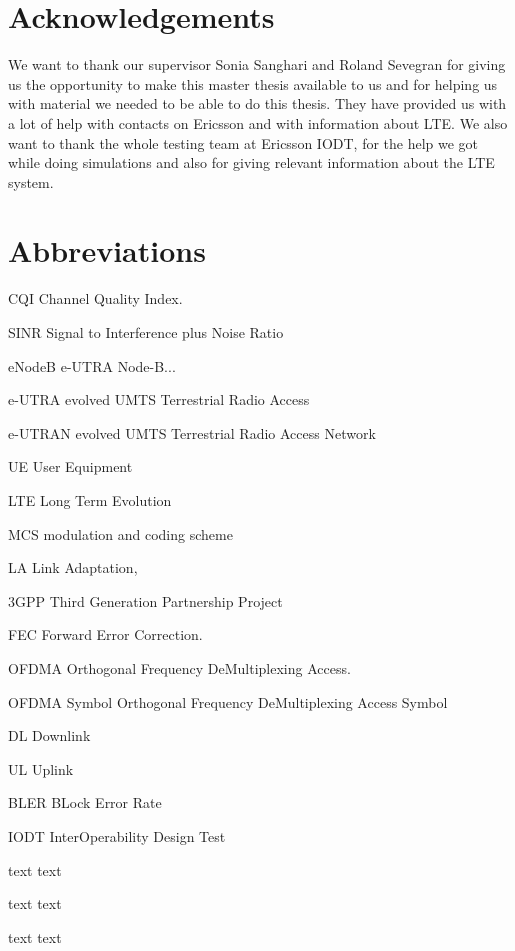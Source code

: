 \documentclass[cropmarks, frame, english]{idamasterthesis}
\author{Paul Nedstrand \& Razmus Lindgren}
\newcommand{\abbrlabel}[1]{\makebox[3cm][l]{\textbf{#1}\ \dotfill}}
\newenvironment{abbreviations}{\begin{list}{}{\renewcommand{\makelabel}{\abbrlabel}}}{\end{list}}
\begin{document}
\makeintropages

\chapter*{Acknowledgements}
We want to thank our supervisor Sonia Sanghari and Roland Sevegran for giving us the opportunity to make this master thesis available to us and for helping us with material we needed to be able to do this thesis. They have provided us with a lot of help with contacts on Ericsson and with information about LTE.
We also want to thank the whole testing team at Ericsson IODT, for the help we got while doing simulations and also for giving relevant information about the LTE system.

\chapter*{Abbreviations}

\begin{abbreviations}
\item[CQI] Channel Quality Index.
\item[SINR] Signal to Interference plus Noise Ratio
\item[eNodeB] e-UTRA Node-B...
\item[e-UTRA] evolved UMTS Terrestrial Radio Access
\item[e-UTRAN] evolved UMTS Terrestrial Radio Access Network
\item[UE] User Equipment
\item[LTE] Long Term Evolution
\item[MCS] modulation and coding scheme
\item[LA] Link Adaptation,
\item[3GPP] Third Generation Partnership Project
\item[FEC] Forward Error Correction.
\item[OFDMA] Orthogonal Frequency DeMultiplexing Access.
\item[OFDMA Symbol] Orthogonal Frequency DeMultiplexing Access Symbol
\item[DL] Downlink
\item[UL] Uplink
\item[BLER] BLock Error Rate
\item[IODT] InterOperability Design Test
\item[text] text
\item[text] text
\item[text] text




\end{abbreviations}
\end{document}
